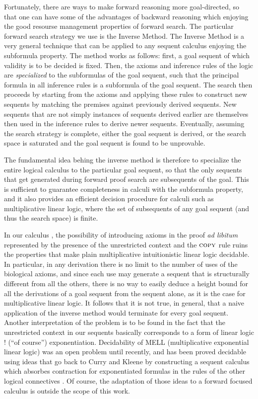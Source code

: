 Fortunately, there are ways to make forward reasoning more goal-directed, so
that one can have some of the advantages of backward reasoning which enjoying
the good resourse management properties of forward search.  The particular
forward search strategy we use is the Inverse Method. The Inverse Method is a
very general technique that can be applied to any sequent calculus enjoying the
subformula property. The method works as follows: first, a goal sequent of which
validity is to be decided is fixed. Then, the axioms and inference rules of the
logic are \emph{specialized} to the subformulas of the goal sequent, such that
the principal formula in all inference rules is a subformula of the goal
sequent. The search then proceeds by starting from the axioms and applying these
rules to construct new sequents by matching the premises against previously
derived sequents. New sequents that are not simply instances of sequents derived
earlier are themselves then used in the inference rules to derive newer
sequents. Eventually, assuming the search strategy is complete, either the goal
sequent is derived, or the search space is saturated and the goal sequent is
found to be unprovable.

The fundamental idea behing the inverse method is therefore to specialize the
entire logical calculus to the particular goal sequent, so that the only
sequents that get generated during forward proof search are subsequents of the
goal. This is sufficient to guarantee completeness in calculi with the
subformula property, and it also provides an efficient decision procedure for
calculi such as multiplicative linear logic, where the set of subsequents of any
goal sequent (and thus the search space) is finite.

In our calculus \zss{}, the possibility of introducing axioms in the proof
\emph{ad libitum} represented by the presence of the unrestricted context and
the $\textsc{copy}$ rule ruins the properties that make plain multiplicative
intuitionistic linear logic decidable. In particular, in any derivation there is
no limit to the number of uses of the biological axioms, and since each use may
generate a sequent that is structurally different from all the others, there is
no way to easily deduce a height bound for all the derivations of a goal sequent
from the sequent alone, as it is the case for multiplicative linear logic. It
follows that it is not true, in general, that a naive application of the inverse
method would terminate for every goal sequent. Another interpretation of the
problem is to be found in the fact that the unrestricted context in our sequents
basically corresponds to a form of linear logic ! (``of course'')
exponentiation. Decidability of MELL (multiplicative exponential linear logic)
was an open problem until recently, and has been proved decidable using ideas
that go back to Curry and Kleene by constructing a sequent calculus which
absorbes contraction for exponentiated formulas in the rules of the other
logical connectives \cite{mell-dec}. Of course, the adaptation of those ideas to
a forward focused calculus is outside the scope of this work.

